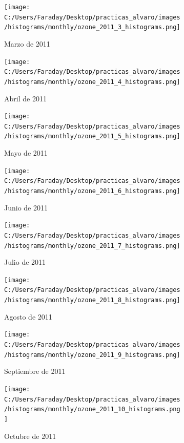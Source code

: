 \documentclass[12pt]{article}
\begin{document}
\begin{figure}[H]
\centering
\begin{subfigure}[h]{0.45\textwidth}
\texttt{[image: C:/Users/Faraday/Desktop/practicas\_alvaro/images/histograms/monthly/ozone\_2011\_3\_histograms.png]}
\caption{Marzo de 2011}
\label{fig:hist-mon-2-3-2011}
\end{subfigure}
%
\begin{subfigure}[H]{0.45\textwidth}
\texttt{[image: C:/Users/Faraday/Desktop/practicas\_alvaro/images/histograms/monthly/ozone\_2011\_4\_histograms.png]}
\caption{Abril de 2011}
\label{fig:hist-mon-2-4-2011}
\end{subfigure}
\caption{}
\end{figure}

\begin{figure}[H]
\centering
\begin{subfigure}[h]{0.45\textwidth}
\texttt{[image: C:/Users/Faraday/Desktop/practicas\_alvaro/images/histograms/monthly/ozone\_2011\_5\_histograms.png]}
\caption{Mayo de 2011}
\label{fig:hist-mon-2-5-2011}
\end{subfigure}
%
\begin{subfigure}[H]{0.45\textwidth}
\texttt{[image: C:/Users/Faraday/Desktop/practicas\_alvaro/images/histograms/monthly/ozone\_2011\_6\_histograms.png]}
\caption{Junio de 2011}
\label{fig:hist-mon-2-6-2011}
\end{subfigure}
\caption{}
\end{figure}

\newpage

\begin{figure}[H]
\centering
\begin{subfigure}[h]{0.45\textwidth}
\texttt{[image: C:/Users/Faraday/Desktop/practicas\_alvaro/images/histograms/monthly/ozone\_2011\_7\_histograms.png]}
\caption{Julio de 2011}
\label{fig:hist-mon-2-7-2011}
\end{subfigure}
%
\begin{subfigure}[H]{0.45\textwidth}
\texttt{[image: C:/Users/Faraday/Desktop/practicas\_alvaro/images/histograms/monthly/ozone\_2011\_8\_histograms.png]}
\caption{Agosto de 2011}
\label{fig:hist-mon-2-8-2011}
\end{subfigure}
\caption{}
\end{figure}

\begin{figure}[H]
\centering
\begin{subfigure}[h]{0.45\textwidth}
\texttt{[image: C:/Users/Faraday/Desktop/practicas\_alvaro/images/histograms/monthly/ozone\_2011\_9\_histograms.png]}
\caption{Septiembre de 2011}
\label{fig:hist-mon-2-9-2011}
\end{subfigure}
%
\begin{subfigure}[H]{0.45\textwidth}
\texttt{[image: C:/Users/Faraday/Desktop/practicas\_alvaro/images/histograms/monthly/ozone\_2011\_10\_histograms.png]}
\caption{Octubre de 2011}
\label{fig:hist-mon-2-10-2011}
\end{subfigure}
\caption{}
\end{figure}
\end{document}
